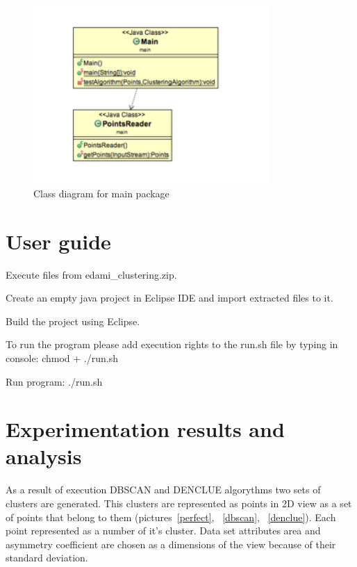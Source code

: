 \documentclass[12pt, a4paper, notitlepage, oneside]{article}
\begin{document}
\begin{itemize}
	\begin{figure}[!ht]
 	\centering
	\includegraphics[width=0.8\textwidth]{images/main_package.png}
 	\caption[]
	{Class diagram for main package}
\label{main}
	\end{figure}


\end{itemize}


\section*{User guide}


Execute files from edami\_clustering.zip.


Create an empty java project in Eclipse IDE and import extracted files to it. 


Build the project using Eclipse.


To run the program please add execution rights to the run.sh file by typing in console: 
	chmod + ./run.sh 


Run program:
 ./run.sh

\newpage


\section*{Experimentation results and analysis}

As a result of execution DBSCAN and DENCLUE algorythms two sets of clusters are generated. This clusters are represented as points in 2D view as a set of points that belong to them (pictures~\ref{perfect}, ~\ref{dbscan}, ~\ref{denclue}). Each point represented as a number of it’s cluster. Data set attributes area and asymmetry coefficient are chosen as a dimensions of the view because of their standard deviation. 
\end{document}
